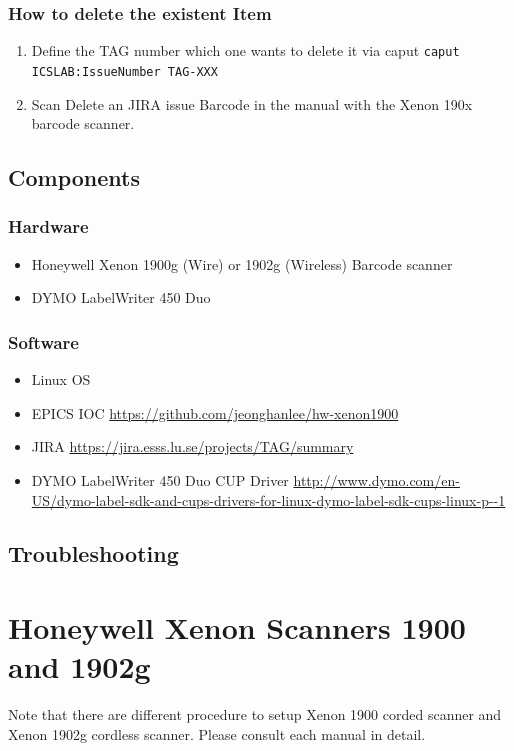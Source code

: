 \documentclass[11pt
  , a4paper
  , article
  , oneside
  , showtrims
]{memoir}
\begin{document}
\subsection{How to delete the existent Item}

\begin{enumerate}
\item  Define the TAG number which one wants to delete it via caput \newline
\texttt{caput ICSLAB:IssueNumber TAG-XXX}
\item Scan Delete an JIRA issue Barcode in the manual with the Xenon 190x barcode scanner.
\end{enumerate}


\section{Components}
\subsection{Hardware}
\begin{itemize}
\item Honeywell Xenon 1900g (Wire) or 1902g (Wireless) Barcode scanner
\item DYMO LabelWriter 450 Duo
\end{itemize}
\subsection{Software}
\begin{itemize}
\item Linux OS
\item EPICS IOC  {\tiny \url{https://github.com/jeonghanlee/hw-xenon1900}}
\item JIRA {\tiny \url{https://jira.esss.lu.se/projects/TAG/summary}}
\item DYMO LabelWriter 450 Duo CUP Driver \newline
  {\tiny
  \url{http://www.dymo.com/en-US/dymo-label-sdk-and-cups-drivers-for-linux-dymo-label-sdk-cups-linux-p--1}}
\end{itemize}

\section{Troubleshooting}


\newpage
\chapter{Honeywell Xenon Scanners 1900 and 1902g}
Note that there are different procedure to setup Xenon 1900 corded scanner and Xenon 1902g cordless scanner. Please consult each manual in detail.
\end{document}
